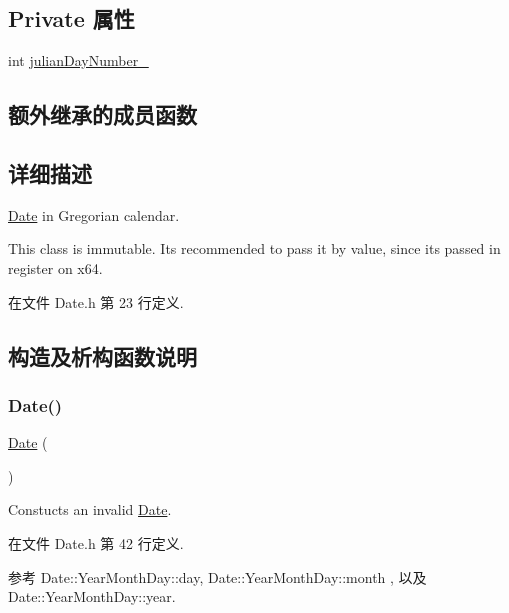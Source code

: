 \subsection*{Private 属性}
\begin{DoxyCompactItemize}
\item 
int \hyperlink{classmuduo_1_1Date_a3ac459925d74b2967686d6d9178c107f}{julian\+Day\+Number\+\_\+}
\end{DoxyCompactItemize}
\subsection*{额外继承的成员函数}


\subsection{详细描述}
\hyperlink{classmuduo_1_1Date}{Date} in Gregorian calendar.

This class is immutable. It\textquotesingle{}s recommended to pass it by value, since it\textquotesingle{}s passed in register on x64. 

在文件 Date.\+h 第 23 行定义.



\subsection{构造及析构函数说明}
\mbox{\label{classmuduo_1_1Date_aff49fc2cda4491ff4457ca481bb8edf9}} 
\subsubsection{\texorpdfstring{Date()}{Date()}\hspace{0.1cm}{\footnotesize\ttfamily [1/4]}}
{\footnotesize\ttfamily \hyperlink{classmuduo_1_1Date}{Date} (\begin{DoxyParamCaption}{ }\end{DoxyParamCaption})\hspace{0.3cm}{\ttfamily [inline]}}

Constucts an invalid \hyperlink{classmuduo_1_1Date}{Date}. 

在文件 Date.\+h 第 42 行定义.



参考 Date\+::\+Year\+Month\+Day\+::day, Date\+::\+Year\+Month\+Day\+::month , 以及 Date\+::\+Year\+Month\+Day\+::year.



